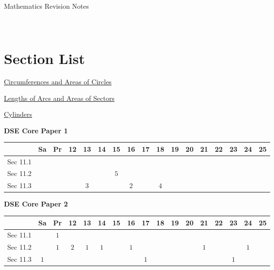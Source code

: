 \documentclass[12pt, a4paper]{article}
\begin{document}
\newpage
\newpage
\thispagestyle{empty}
\begin{center}
Mathematics Revision Notes\\\vspace{1cm}
\\\vspace{1cm}
{\fontsize{24pt}{24pt}\selectfont {Areas and Volumes (II)}} \\\vspace{1cm}
\label{chapter:S2-11}

\end{center}
\vspace{0.5cm}
\hline
\section*{Section List}
\begin{enumx}[label=Sec 11.\arabic*\ ]
\item \hyperref[section:2-11-1]{Circumferences and Areas of Circles}
\item \hyperref[section:2-11-2]{Lengths of Arcs and Areas of Sectors}
\item \hyperref[section:2-11-3]{Cylinders}
\end{enumx}
\begin{absolutelynopagebreak}
\begin{center}
\textbf{DSE Core Paper 1}
\end{center}
\begin{center}
\begin{tabular}{|l|c|c|c|c|c|c|c|c|c|c|c|c|c|c|c|c|}
\hline
        & Sa & Pr & 12 & 13 & 14 & 15 & 16 & 17 & 18 & 19 & 20 & 21 & 22 & 23 & 24 & 25 \\\hline\hline
Sec 11.1 &  &  &  &  &  &  &  &  &  &  &  &  &  &  &  &  \\\hline
Sec 11.2 &  &  &  &  &  &  $5$ &  &  &  &  &  &  &  &  &  &  \\\hline
Sec 11.3 &  &  &  &  $3$ &  &  &  $2$ &  &  $4$ &  &  &  &  &  &  &  \\\hline
\end{tabular}
\end{center}
\end{absolutelynopagebreak}
\begin{absolutelynopagebreak}
\begin{center}
\textbf{DSE Core Paper 2}
\end{center}
\begin{center}
\begin{tabular}{|l|c|c|c|c|c|c|c|c|c|c|c|c|c|c|c|c|}
\hline
        & Sa & Pr & 12 & 13 & 14 & 15 & 16 & 17 & 18 & 19 & 20 & 21 & 22 & 23 & 24 & 25 \\\hline\hline
Sec 11.1 &  &  $1$ &  &  &  &  &  &  &  &  &  &  &  &  &  &  \\\hline
Sec 11.2 &  &  $1$ &  $2$ &  $1$ &  $1$ &  &  $1$ &  &  &  &  &  $1$ &  &  &  $1$ &  \\\hline
Sec 11.3 &  $1$ &  &  &  &  &  &  &  $1$ &  &  &  &  &  &  $1$ &  &  \\\hline
\end{tabular}
\end{center}
\end{absolutelynopagebreak}
\end{document}
